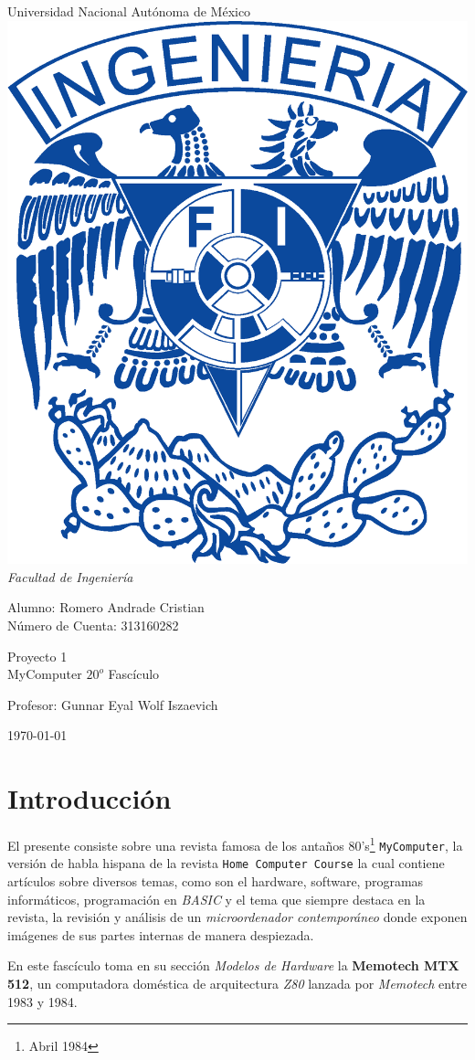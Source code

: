 \documentclass{article}
\begin{document}
\begin{titlepage}
  \begin{center}
    \Huge{Universidad Nacional Autónoma de México}
    \vfill
    \includegraphics[width=0.2\linewidth]{img/UNAM_INGENIERIA}
    \vfill
    \LARGE{\emph{Facultad de Ingeniería}}
    \vfill
    
    \Large{Alumno: Romero Andrade Cristian\\Número de Cuenta: 313160282} 
    
    \vfill
    
    \huge{Proyecto 1\\MyComputer $20^o$ Fascículo}
    \vfill
    
    
    \large{Profesor: Gunnar Eyal Wolf Iszaevich}

    \vfill

    {\large \today\par}
    \newpage
  \end{center}
\end{titlepage}



\section{Introducción}\label{sec:introduction}

El presente consiste sobre una revista famosa de los antaños 80's\footnote{Abril 1984} \texttt{MyComputer},
la versión de habla hispana de la revista \texttt{Home Computer Course} la cual contiene artículos sobre
diversos temas, como son el hardware, software, programas informáticos, programación en \textit{BASIC} y el
tema que siempre destaca en la revista, la revisión y análisis de un \textit{microordenador contemporáneo} donde
exponen imágenes de sus partes internas de manera despiezada.

En este fascículo toma en su sección \textit{Modelos de Hardware} la \textbf{Memotech MTX 512}, un computadora
doméstica de arquitectura \textit{Z80} lanzada por \textit{Memotech} entre 1983 y 1984.
\end{document}
